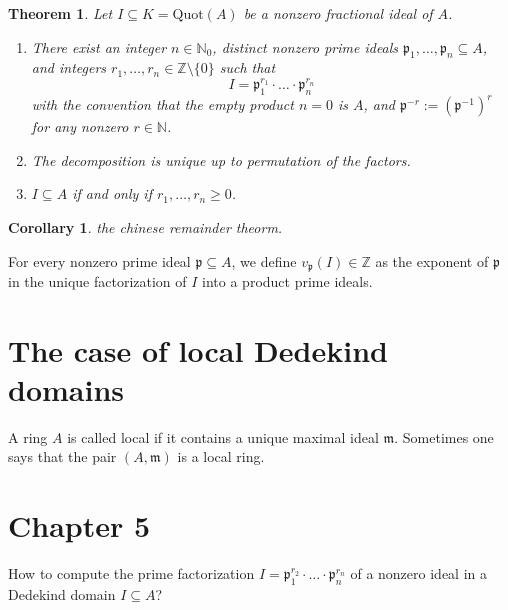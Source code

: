 \documentclass[a4paper]{book}
\theoremstyle{break}
\theoremstyle{plain}
\newtheorem{theorem}{Theorem}[definition]
\newtheorem{corollary}{Corollary}
\begin{document}
\begin{theorem}
    Let \(I \subseteq K = \text{Quot}(A)\) be a nonzero fractional ideal of \(A\).
    \begin{enumerate}
        \item There exist an integer \(n \in \mathbb{N}_0\), distinct nonzero prime ideals \(\mathfrak{p}_1, \ldots, \mathfrak{p}_n \subseteq A\), and integers \(r_1, \ldots, r_n \in \mathbb{Z} \setminus \{0\}\) such that
        \begin{equation}
            I = \mathfrak{p}_1^{r_1} \cdot \ldots \cdot \mathfrak{p}_n^{r_n}
        \end{equation}
        with the convention that the empty product \(n = 0\) is \(A\), and \(\mathfrak{p}^{-r} := \left(\mathfrak{p}^{-1}\right)^r\) for any nonzero \(r \in \mathbb{N}\).
        \item The decomposition is unique up to permutation of the factors.
        \item \(I \subseteq A\) if and only if \(r_1, \ldots, r_n \geq 0\).
    \end{enumerate}
\end{theorem}

\begin{corollary}
    the chinese remainder theorm.
\end{corollary}

\begin{definition}
    For every nonzero prime ideal \(\mathfrak{p} \subseteq A\), we define \(v_\mathfrak{p}(I) \in \mathbb{Z}\) as the exponent of \(\mathfrak{p}\) in the unique factorization of \(I\) into a product prime ideals.
\end{definition}

\section{The case of local Dedekind domains}

\begin{definition}
    A ring \(A\) is called local if it contains a unique maximal ideal \(\mathfrak{m}\). Sometimes one says that the pair \((A, \mathfrak{m})\) is a local ring.
\end{definition}

\section{Chapter 5}

How to compute the prime factorization \(I = \mathfrak{p}_1^{r_2} \cdot \ldots \cdot \mathfrak{p}_n^{r_n}\) of a nonzero ideal in a Dedekind domain \(I \subseteq A\)?
\end{document}
